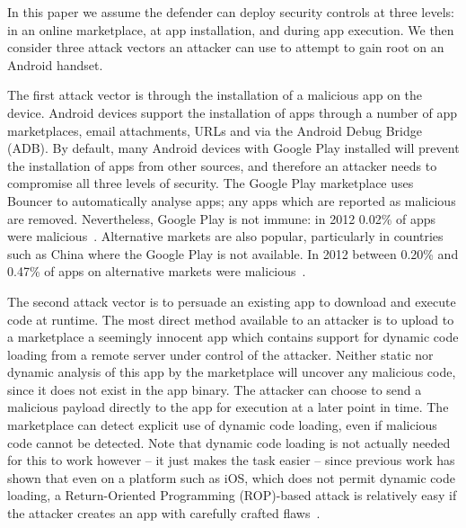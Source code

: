 \documentclass{llncs}
\begin{document}
In this paper we assume the defender can deploy security controls at three levels: in an online marketplace, at app installation, and during app execution.
We then consider three attack vectors an attacker can use to attempt to gain root on an Android handset.

The first attack vector is through the installation of a malicious app on the device.
Android devices support the installation of apps through a number of app marketplaces, email attachments, URLs and via the Android Debug Bridge (ADB).
By default, many Android devices with Google Play installed will prevent the installation of apps from other sources, and therefore an attacker needs to compromise all three levels of security.
The Google Play marketplace uses Bouncer to automatically analyse apps; any apps which are reported as malicious are removed.
Nevertheless, Google Play is not immune: in 2012 0.02\% of apps were malicious~\cite{Zhou2012a}.
Alternative markets are also popular, particularly in countries such as China where the Google Play is not available. 
In 2012 between 0.20\% and 0.47\% of apps on alternative markets were malicious~\cite{Zhou2012a}.

The second attack vector is to persuade an existing app to download and execute code at runtime.
The most direct method available to an attacker is to upload to a marketplace a seemingly innocent app which contains support for dynamic code loading from a remote server under control of the attacker.
Neither static nor dynamic analysis of this app by the marketplace will uncover any malicious code, since it does not exist in the app binary.
The attacker can choose to send a malicious payload directly to the app for execution at a later point in time.
The marketplace can detect explicit use of dynamic code loading, even if malicious code cannot be detected. Note that dynamic code loading is not actually needed for this to work however -- it just makes the task easier -- since previous work has shown that even on a platform such as iOS, which does not permit dynamic code loading, a Return-Oriented Programming (ROP)-based attack is relatively easy if the attacker creates an app with carefully crafted flaws~\cite{Wang2013a}.
\end{document}
